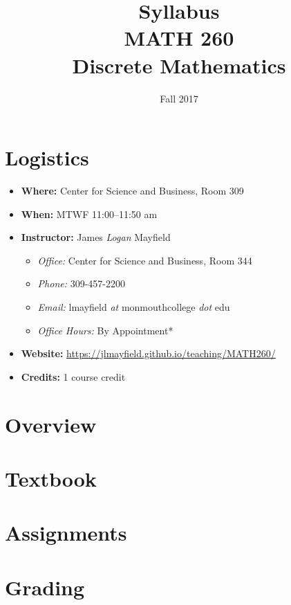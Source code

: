 \documentclass[nobib]{tufte-handout}
\title{Syllabus \\ MATH 260 \\ Discrete Mathematics}
\author{}
\date{ Fall 2017 }
\begin{document}
\maketitle

\section{Logistics}
\begin{itemize}
\item \textbf{Where: } Center for Science and Business, Room 309
\item \textbf{When: } MTWF 11:00--11:50 am
\item \textbf{Instructor:} James \textit{Logan} Mayfield
\begin{itemize}
\item \textit{Office: } Center for Science and Business, Room 344
\item \textit{Phone: } 309-457-2200 %
\item \textit{Email: } lmayfield \textit{at} monmouthcollege \textit{dot} edu
\item \textit{Office Hours: } By Appointment*
\end{itemize}
\item \textbf{Website: } \url{https://jlmayfield.github.io/teaching/MATH260/}
\item \textbf{Credits: } 1 course credit
\end{itemize}

\section{Overview}


\section{Textbook}



\section{Assignments}


\section{Grading}
\end{document}
